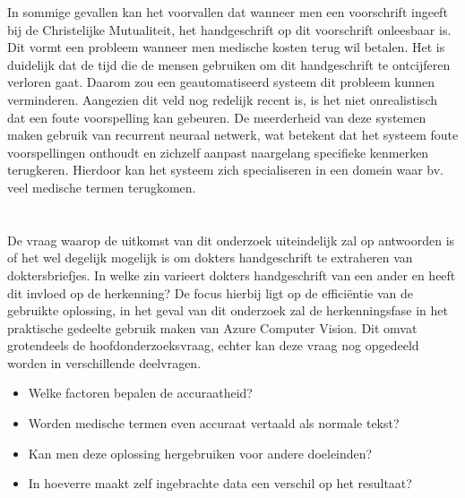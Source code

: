 In sommige gevallen kan het voorvallen dat wanneer men een voorschrift ingeeft bij de Christelijke Mutualiteit, het handgeschrift op dit voorschrift onleesbaar is. Dit vormt een probleem wanneer men medische kosten terug wil betalen. Het is duidelijk dat de tijd die de mensen gebruiken om dit handgeschrift te ontcijferen verloren gaat. Daarom zou een geautomatiseerd systeem dit probleem kunnen verminderen. Aangezien dit veld nog redelijk recent is, is het niet onrealistisch dat een foute voorspelling kan gebeuren. De meerderheid van deze systemen maken gebruik van recurrent neuraal netwerk, wat betekent dat het systeem foute voorspellingen onthoudt en zichzelf aanpast naargelang specifieke kenmerken terugkeren. Hierdoor kan het systeem zich specialiseren in een domein waar bv. veel medische termen terugkomen. 

\section{}
\label{sec:onderzoeksvraag}


De vraag waarop de uitkomst van dit onderzoek uiteindelijk zal op antwoorden is of het wel degelijk mogelijk is om dokters handgeschrift te extraheren van doktersbriefjes. In welke zin varieert dokters handgeschrift van een ander en heeft dit invloed op de herkenning?  De focus hierbij ligt op de efficiëntie van de gebruikte oplossing, in het geval van dit onderzoek zal de herkenningsfase in het praktische gedeelte gebruik maken van Azure Computer Vision. Dit omvat grotendeels de hoofdonderzoeksvraag, echter kan deze vraag nog opgedeeld worden in verschillende deelvragen. 
\begin{itemize}
  \item  Welke factoren bepalen de accuraatheid? 
  \item  Worden medische termen even accuraat vertaald als normale tekst? 
  \item  Kan men deze oplossing hergebruiken voor andere doeleinden? 
  \item  In hoeverre maakt zelf ingebrachte data een verschil op het resultaat? 
\end{itemize}

\section{}
\label{sec:onderzoeksdoelstelling}

